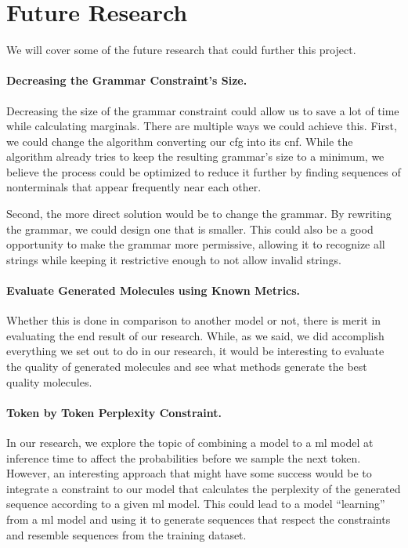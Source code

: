 \documentclass[../Document.tex]{subfiles}
\begin{document}
\section{Future Research}
\label{sec:conc/future}
We will cover some of the future research that could further this project.

\paragraph{Decreasing the Grammar Constraint's Size.}
Decreasing the size of the grammar constraint could allow us to save a lot of time while calculating marginals.
There are multiple ways we could achieve this.
First, we could change the algorithm converting our \gls{cfg} into its \acrlong{cnf}.
While the algorithm already tries to keep the resulting grammar's size to a minimum, we believe the process could be optimized to reduce it further by finding sequences of nonterminals that appear frequently near each other.

Second, the more direct solution would be to change the grammar.
By rewriting the grammar, we could design one that is smaller.
This could also be a good opportunity to make the grammar more permissive, allowing it to recognize all \smiles strings while keeping it restrictive enough to not allow invalid \smiles strings.


\paragraph{Evaluate Generated Molecules using Known Metrics.}
Whether this is done in comparison to another model or not, there is merit in evaluating the end result of our research.
While, as we said, we did accomplish everything we set out to do in our research, it would be interesting to evaluate the quality of generated molecules and see what methods generate the best quality molecules.


\paragraph{Token by Token Perplexity Constraint.}
In our research, we explore the topic of combining a \cp model to a \gls{ml} model at inference time to affect the probabilities before we sample the next token.
However, an interesting approach that might have some success would be to integrate a constraint to our \cp model that calculates the perplexity of the generated sequence according to a given \gls{ml} model.
This could lead to a \cp model ``learning'' from a \gls{ml} model and using it to generate sequences that respect the constraints and resemble sequences from the training dataset.
\end{document}
